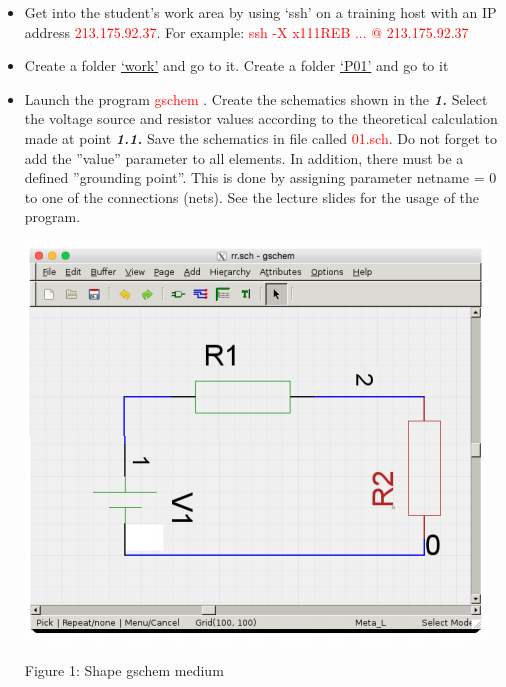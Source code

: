 \documentclass{report}
\begin{document}
\begin{itemize}
  \item Get into the student’s work area by using ‘ssh’ on a training host with an IP address
\textcolor{red}{213.175.92.37}. For example: \textcolor{red}{ssh -X x111REB ... @ 213.175.92.37}
  \item Create a folder \underline{‘work’} and go to it. Create a folder \underline{‘P01’} and go to it
  
  \item Launch the program \textcolor{red}{gschem} . Create the schematics shown in the \textbf{\textit{1. }}Select the voltage
source and resistor values according to the theoretical calculation made at point \textbf{\textit{1.1.}}
Save the schematics in file called \textcolor{red}{01.sch}. Do not forget to add the ”value” parameter
to all elements. In addition, there must be a defined ”grounding point”. This is done by
assigning parameter netname = 0 to one of the connections (nets). See the lecture slides
for the usage of the program.


\includegraphics{one}
\begin{center}
Figure 1: Shape gschem medium
\end{center}


\end{itemize}
\end{document}
